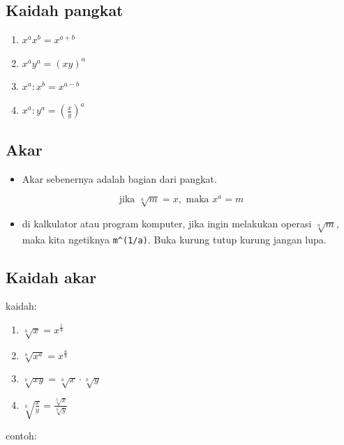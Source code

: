\documentclass[
  letterpaper,
  DIV=11,
  numbers=noendperiod]{scrartcl}
\providecommand{\tightlist}{%
  \setlength{\itemsep}{0pt}\setlength{\parskip}{0pt}}\usepackage{longtable,booktabs,array}
\begin{document}
\subsection{Kaidah pangkat}\label{kaidah-pangkat-1}

\begin{enumerate}
\def\labelenumi{\arabic{enumi}.}
\setcounter{enumi}{9}
\item
  \(x^ax^b=x^{a+b}\)
\item
  \(x^ay^a=(xy)^a\)
\item
  \(x^a:x^b=x^{a-b}\)
\item
  \(x^a:y^a=(\frac{x}{y})^a\)
\end{enumerate}

\subsection{Akar}\label{akar}

\begin{itemize}
\tightlist
\item
  Akar sebenernya adalah bagian dari pangkat.
\end{itemize}

\[
\text {jika } \sqrt[a]{m}=x, \text{ maka } x^a=m
\]

\begin{itemize}
\tightlist
\item
  di kalkulator atau program komputer, jika ingin melakukan operasi
  \(\sqrt[a]{m}\), maka kita ngetiknya \texttt{m\^{}(1/a)}. Buka kurung
  tutup kurung jangan lupa.
\end{itemize}

\subsection{Kaidah akar}\label{kaidah-akar}

kaidah:

\begin{enumerate}
\def\labelenumi{\arabic{enumi}.}
\tightlist
\item
  \(\sqrt[b]{x}=x^{\frac{1}{b}}\)
\item
  \(\sqrt[b]{x^a}=x^{\frac{a}{b}}\)
\item
  \(\sqrt[b]{xy}=\sqrt[b]{x} \cdot \sqrt[b]{y}\)
\item
  \(\sqrt[b]{\frac{x}{y}}=\frac{\sqrt[b]{x}}{\sqrt[b]{y}}\)
\end{enumerate}

contoh:
\end{document}
